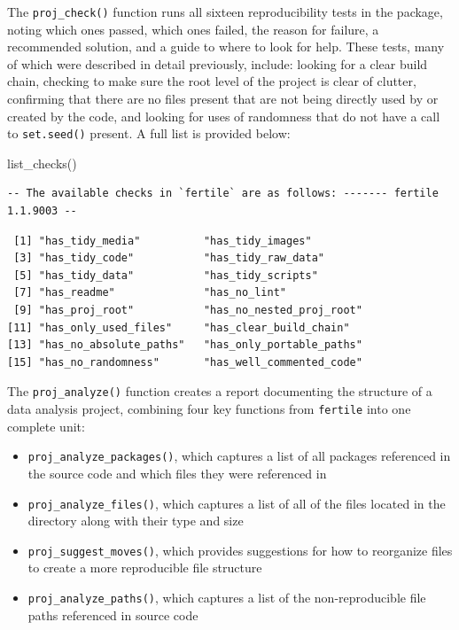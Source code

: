\documentclass[12pt,twoside]{reedthesis}
\newenvironment{Shaded}{\begin{snugshade}}{\end{snugshade}}
\newcommand{\FunctionTok}[1]{\textcolor[rgb]{0.00,0.00,0.00}{#1}}
\newcommand{\NormalTok}[1]{#1}
\providecommand{\tightlist}{%
  \setlength{\itemsep}{0pt}\setlength{\parskip}{0pt}}
\begin{document}
The \texttt{proj\_check()} function runs all sixteen reproducibility tests in the package, noting which ones passed, which ones failed, the reason for failure, a recommended solution, and a guide to where to look for help. These tests, many of which were described in detail previously, include: looking for a clear build chain, checking to make sure the root level of the project is clear of clutter, confirming that there are no files present that are not being directly used by or created by the code, and looking for uses of randomness that do not have a call to \texttt{set.seed()} present. A full list is provided below:
\begin{Shaded}
\begin{Highlighting}[]
\FunctionTok{list\_checks}\NormalTok{()}
\end{Highlighting}
\end{Shaded}
\begin{verbatim}
-- The available checks in `fertile` are as follows: ------- fertile 1.1.9003 --
\end{verbatim}
\begin{verbatim}
 [1] "has_tidy_media"          "has_tidy_images"        
 [3] "has_tidy_code"           "has_tidy_raw_data"      
 [5] "has_tidy_data"           "has_tidy_scripts"       
 [7] "has_readme"              "has_no_lint"            
 [9] "has_proj_root"           "has_no_nested_proj_root"
[11] "has_only_used_files"     "has_clear_build_chain"  
[13] "has_no_absolute_paths"   "has_only_portable_paths"
[15] "has_no_randomness"       "has_well_commented_code"
\end{verbatim}
The \texttt{proj\_analyze()} function creates a report documenting the structure of a data analysis project, combining four key functions from \texttt{fertile} into one complete unit:
\begin{itemize}
\tightlist
\item
  \texttt{proj\_analyze\_packages()}, which captures a list of all packages referenced in the source code and which files they were referenced in
\item
  \texttt{proj\_analyze\_files()}, which captures a list of all of the files located in the directory along with their type and size
\item
  \texttt{proj\_suggest\_moves()}, which provides suggestions for how to reorganize files to create a more reproducible file structure
\item
  \texttt{proj\_analyze\_paths()}, which captures a list of the non-reproducible file paths referenced in source code
\end{itemize}
\end{document}
